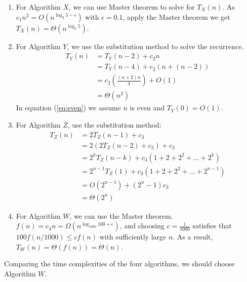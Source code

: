 \documentclass[letterpaper, 11pt]{article}
\begin{document}
\begin{enumerate}
\item For Algorithm $X$, we can use Master theorem to solve for $T_X(n)$. As $c_1n^2=O(n^{\log_{2}{5}-\epsilon})$ with $\epsilon=0.1$, apply the Master theorem we get $T_X(n)=\Theta(n^{\log_{2}{5}})$.

\item For Algorithm $Y$, we use the substitution method to solve the recurrence.\\
\begin{align}
    T_Y(n) &= T_Y(n-2) + c_2n\\
           &= T_Y(n-4) + c_2(n+(n-2))\\
           &= c_2(\frac{(n+2)n}{4})+O(1) \label{eq:even}\\
           &= \Theta(n^2)
\end{align}
In equation (\ref{eq:even}) we assume $n$ is even and $T_Y(0)=O(1)$.

\item For Algorithm $Z$, use the substitution method:\\
\begin{align}
    T_Z(n) &= 2T_Z(n-1)+c_3\\
           &= 2(2T_Z(n-2)+c_3)+c_3\\
           &= 2^{k}T_Z(n-k)+c_3(1+2+2^2+\dots+2^k)\\
           &= 2^{n-1}T_Z(1)+c_3(1+2+2^2+\dots+2^{n-1})\\
           &= O(2^{n-1})+(2^{n}-1)c_3\\
           &= \Theta(2^n)
\end{align}

\item For Algorithm $W$, we can use the Master theorem. $f(n)=c_4n=\Omega(n^{\log_{1000}{100}+\epsilon})$, and choosing $c=\frac{1}{1000}$ satisfies that $100f(n/1000) \le cf(n)$ with sufficiently large $n$. As a result, $T_W(n)=\Theta(f(n))=\Theta(n)$.
\end{enumerate}
Comparing the time complexities of the four algorithms, we should choose Algorithm $W$.
\end{document}
